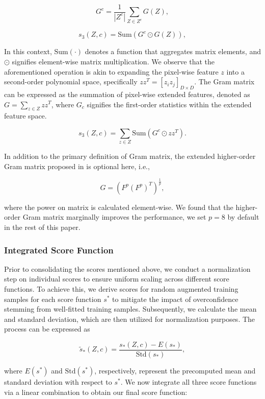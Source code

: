 \documentclass{gji}
\begin{document}
    \[ G^c = \frac{1}{|Z^c|} \sum_{Z \in Z^c} G(Z), \tag{17} \label{17} \]

    \[ s_3(Z, c) = \text{Sum}(G^c \odot G(Z)), \tag{18} \label{18} \]

In this context, $\text{Sum}(\cdot)$ denotes a function that aggregates matrix elements, and $\odot$ signifies element-wise matrix multiplication. We observe that the aforementioned operation is akin to expanding the pixel-wise feature $z$ into a second-order polynomial space, specifically $zz^T = [z_iz_j]_{D \times D}$. The Gram matrix can be expressed as the summation of pixel-wise extended features, denoted as $G = \sum_{z \in Z} zz^T$, where $G_c$ signifies the first-order statistics within the extended feature space.

\[ s_3(Z, c) = \sum_{z \in Z} \text{Sum}(G^c \odot zz^T). \]

In addition to the primary definition of Gram matrix, the extended higher-order Gram matrix proposed in \cite{33} is optional here, i.e.,

\[ G = \left( F^p(F^p)^T \right)^{\frac{1}{p}}, \tag{19} \label{19}  \]

where the power on matrix is calculated element-wise. We found that the higher-order Gram matrix marginally improves the performance, we set $p = 8$ by default in the rest of this paper.

  \subsubsection{Integrated Score Function}

  Prior to consolidating the scores mentioned above, we conduct a normalization step on individual scores to ensure uniform scaling across different score functions. To achieve this, we derive scores for random augmented training samples for each score function $s^*$ to mitigate the impact of overconfidence stemming from well-fitted training samples. Subsequently, we calculate the mean and standard deviation, which are then utilized for normalization purposes. The process can be expressed as

    \[ \tilde{s}_*(Z, c) = \frac{s_*(Z, c) - E(s_*)}{\text{Std}(s_*)}, \tag{20} \label{eq20} \]
    
    where $E(s^*)$ and $\text{Std}(s^*)$, respectively, represent the precomputed mean and standard deviation with respect to $s^*$. We now integrate all three score functions via a linear combination to obtain our final score function:
    
\end{document}
